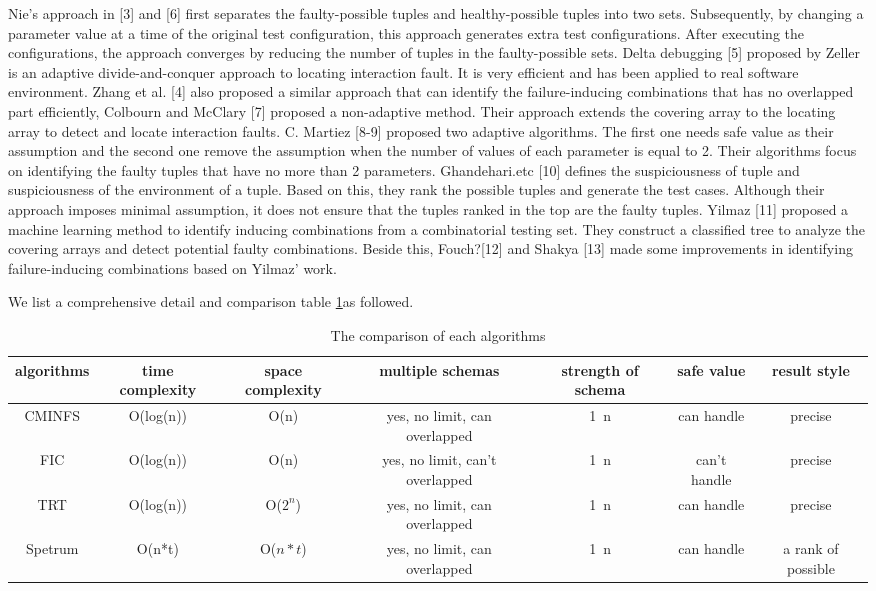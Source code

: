 \documentclass[10pt,journal,cspaper,compsoc]{IEEEtran}
\begin{document}
Nie's approach in [3] and [6] first separates the faulty-possible tuples and healthy-possible tuples into two sets. Subsequently, by changing a parameter value at a time of the original test configuration, this approach generates extra test configurations. After executing the configurations, the approach converges by reducing the number of tuples in the faulty-possible sets.
Delta debugging [5] proposed by Zeller is an adaptive divide-and-conquer approach to locating interaction fault. It is very efficient and has been applied to real software environment. Zhang et al. [4] also proposed a similar approach that can identify the failure-inducing combinations that has no overlapped part efficiently,
Colbourn and McClary [7] proposed a non-adaptive method. Their approach extends the covering array to the locating array to detect and locate interaction faults.
C. Martiez [8-9] proposed two adaptive algorithms. The first one needs safe value as their assumption and the second one remove the assumption when the number of values of each parameter is equal to 2. Their algorithms focus on identifying the faulty tuples that have no more than 2 parameters.
Ghandehari.etc [10] defines the suspiciousness of tuple and suspiciousness of the environment of a tuple. Based on this, they rank the possible tuples and generate the test cases. Although their approach imposes minimal assumption, it does not ensure that the tuples ranked in the top are the faulty tuples.
Yilmaz [11] proposed a machine learning method to identify inducing combinations from a combinatorial testing set. They construct a classified tree to analyze the covering arrays and detect potential faulty combinations. Beside this, Fouch?[12] and Shakya [13] made some improvements in identifying failure-inducing combinations based on Yilmaz' work.

We list a comprehensive detail and comparison table \ref{comparison-metrics}as followed.

\begin{table}\renewcommand{\arraystretch}{1.3}
  \caption{The comparison of each algorithms} \centering
  \label{comparison-metrics}
  \begin{tabular}{c|c|c|c|c|c|c}\hline
  \hline
  \bfseries algorithms & \bfseries time complexity  & \bfseries space complexity & \bfseries multiple schemas & \bfseries strength of schema & \bfseries safe value & \bfseries result style \\
  \hline
    CMINFS & O(log(n)) & O(n) & yes, no limit, can overlapped & 1~n & can handle & precise \\
  \hline
    FIC & O(log(n)) & O(n) & yes, no limit, can't overlapped & 1~n & can't handle & precise \\
    TRT & O(log(n)) & O($2^n$) & yes, no limit, can overlapped & 1~n & can handle &precise \\
    Spetrum & O(n*t) & O($n*t$) & yes, no limit, can overlapped & 1~n & can handle & a rank of possible \\
  \hline
  \end{tabular}

\end{table}
\end{document}
